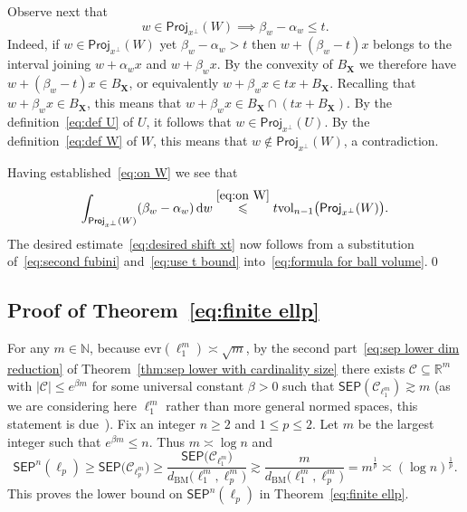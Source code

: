 \documentclass[11pt,reqno]{amsart}
\renewcommand{\le}{\leqslant}
\renewcommand{\ge}{\geqslant}
\newcommand{\ud}[0]{\,\mathrm{d}}
\newcommand{\evr}{\mathrm{evr}}
\newcommand{\proj}{\mathsf{Proj}}
\newcommand{\X}{\mathbf X}
\newcommand{\R}{\mathbb R}
\theoremstyle{remark}
\renewcommand{\subset}{\subseteq}
\newcommand{\N}{\mathbb N}
\newcommand{\BM}{\mathrm{BM}}
\newcommand{\sub}{\mathscr{C}}
\newcommand{\vol}{\mathrm{vol}}
\renewcommand{\1}{\mathbf 1}
\newcommand{\sep}{\mathsf{SEP}}
\begin{document}
Observe next that
\begin{equation}\label{eq:on W}
w\in \proj_{x^{\perp}}(W)\implies \beta_w-\alpha_w\le t.
\end{equation}
Indeed, if $w\in \proj_{x^{\perp}}(W)$ yet  $\beta_w-\alpha_w>t$ then $w+(\beta_w-t)x$ belongs to the interval joining $w+\alpha_wx$ and $w+\beta_wx$. By the convexity of $B_{\X}$ we therefore  have $w+(\beta_w-t)x\in B_{\X}$, or equivalently $w+\beta_wx\in tx+B_{\X}$. Recalling  that $w+\beta_w x\in B_{\X}$, this means that $w+\beta_w x\in B_{\X}\cap (tx+B_{\X})$. By the definition~\eqref{eq:def U} of $U$, it follows that $w\in \proj_{x^\perp}(U)$. By the definition~\eqref{eq:def W} of $W$, this means that $w\notin \proj_{x^\perp}(W)$, a contradiction.

Having established~\eqref{eq:on W} we see that
\begin{equation}\label{eq:use t bound}
\int_{\proj_{x^{\perp}} (W)} (\beta_w-\alpha_w)\ud w\stackrel{\eqref{eq:on W}}{\le} t\vol_{n-1}\big(\proj_{x^{\perp}} (W)\big).
\end{equation}
The desired estimate~\eqref{eq:desired shift xt} now follows from a substitution of~\eqref{eq:second fubini} and~\eqref{eq:use t bound} into~\eqref{eq:formula for ball volume}.\qed







\subsection{Proof of Theorem~\ref{eq:finite ellp}}\label{sec:finite Lp} For any $m\in \N$, because  $\evr(\ell_1^m)\asymp \sqrt{m}$, by the second part~\eqref{eq:sep lower dim reduction} of Theorem~\ref{thm:sep lower with cardinality size}  there exists $\sub\subset \R^m$ with $|\sub|\le e^{\beta m}$ for some universal constant $\beta>0$ such that $\sep(\sub_{\ell_1^m}) \gtrsim m$ (as we are considering here $\ell_1^m$ rather than more general normed spaces, this statement is due~\cite{CCGGP98}). Fix an integer $n\ge 2$ and $1\le p\le 2$. Let $m$ be the largest integer such that $e^{\beta m}\le n$. Thus $m\asymp \log n$ and
$$
\sep^n(\ell_p)\ge \sep\big(\sub_{\ell_p^m}\big)\ge \frac{\sep\big(\sub_{\ell_1^m}\big)}{d_{\BM}\big(\ell_1^m,\ell_p^m\big)}\gtrsim \frac{m}{d_{\BM}\big(\ell_1^m,\ell_p^m\big)}=m^{\frac{1}{p}}\asymp (\log n)^{\frac{1}{p}}.
$$
This proves the lower bound on $\sep^n(\ell_p)$ in Theorem~\ref{eq:finite ellp}.
\end{document}
